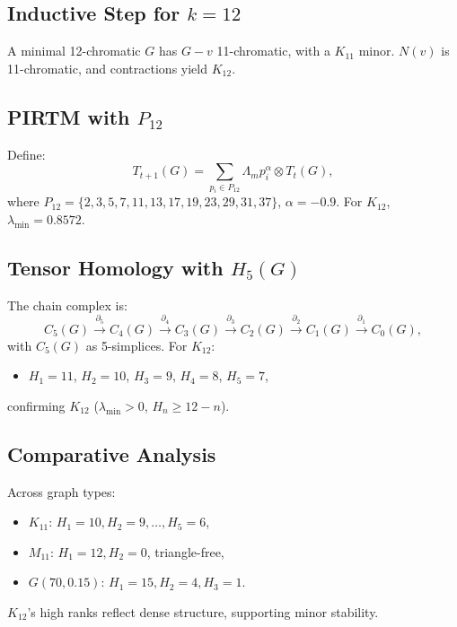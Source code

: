 \documentclass{article}
\theoremstyle{plain}
\begin{document}
\subsection{Inductive Step for \( k = 12 \)}
A minimal 12-chromatic \( G \) has \( G - v \) 11-chromatic, with a \( K_{11} \) minor. \( N(v) \) is 11-chromatic, and contractions yield \( K_{12} \).

\subsection{PIRTM with \( P_{12} \)}
Define:
\begin{equation}
T_{t+1}(G) = \sum_{p_i \in P_{12}} \Lambda_m p_i^\alpha \otimes T_t(G),
\end{equation}
where \( P_{12} = \{2, 3, 5, 7, 11, 13, 17, 19, 23, 29, 31, 37\} \), \( \alpha = -0.9 \). For \( K_{12} \), \( \lambda_{\text{min}} = 0.8572 \).

\subsection{Tensor Homology with \( H_5(G) \)}
The chain complex is:
\begin{equation}
C_5(G) \xrightarrow{\partial_5} C_4(G) \xrightarrow{\partial_4} C_3(G) \xrightarrow{\partial_3} C_2(G) \xrightarrow{\partial_2} C_1(G) \xrightarrow{\partial_1} C_0(G),
\end{equation}
with \( C_5(G) \) as 5-simplices. For \( K_{12} \):
\begin{itemize}
    \item \( H_1 = 11 \), \( H_2 = 10 \), \( H_3 = 9 \), \( H_4 = 8 \), \( H_5 = 7 \),
\end{itemize}
confirming \( K_{12} \) (\( \lambda_{\text{min}} > 0 \), \( H_n \geq 12 - n \)).

\subsection{Comparative Analysis}
Across graph types:
\begin{itemize}
    \item \( K_{11} \): \( H_1 = 10, H_2 = 9, \ldots, H_5 = 6 \),
    \item \( M_{11} \): \( H_1 = 12, H_2 = 0 \), triangle-free,
    \item \( G(70, 0.15) \): \( H_1 = 15, H_2 = 4, H_3 = 1 \).
\end{itemize}
\( K_{12} \)’s high ranks reflect dense structure, supporting minor stability.
\end{document}
